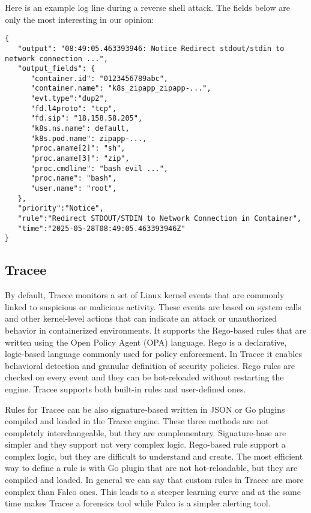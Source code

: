 \noindent Here is an example log line during a reverse shell attack. The fields below are only the most interesting in our opinion:
\begin{verbatim}
{
   "output": "08:49:05.463393946: Notice Redirect stdout/stdin to network connection ...",
   "output_fields": {
      "container.id": "0123456789abc",
      "container.name": "k8s_zipapp_zipapp-...",
      "evt.type":"dup2",
      "fd.l4proto": "tcp",
      "fd.sip": "18.158.58.205",
      "k8s.ns.name": default,
      "k8s.pod.name": zipapp-...,
      "proc.aname[2]": "sh",
      "proc.aname[3]": "zip",
      "proc.cmdline": "bash evil ...",
      "proc.name": "bash",
      "user.name": "root",
   },
   "priority":"Notice",
   "rule":"Redirect STDOUT/STDIN to Network Connection in Container",
   "time":"2025-05-28T08:49:05.463393946Z"
}
\end{verbatim}


\subsection{Tracee}
By default, Tracee monitors a set of Linux kernel events that are commonly linked to suspicious or malicious activity. These events are based on system calls and other kernel-level actions that can indicate an attack or unauthorized behavior in containerized environments. It supports the Rego-based rules that are written using the Open Policy Agent (OPA) language. Rego is a declarative, logic-based language commonly used for policy enforcement. In Tracee it enables behavioral detection and granular definition of security policies. Rego rules are checked on every event and they can be hot-reloaded without restarting the engine. Tracee supports both built-in rules and user-defined ones.

Rules for Tracee can be also signature-based written in JSON or Go plugins compiled and loaded in the Tracee engine. These three methods are not completely interchangeable, but they are complementary. Signature-base are simpler and they support not very complex logic. Rego-based rule support a complex logic, but they are difficult to understand and create. The most efficient way to define a rule is with Go plugin that are not hot-reloadable, but they are compiled and loaded. In general we can say that custom rules in Tracee are more complex than Falco ones. This leads to a steeper learning curve and at the same time makes Tracee a forensics tool while Falco is a simpler alerting tool.

